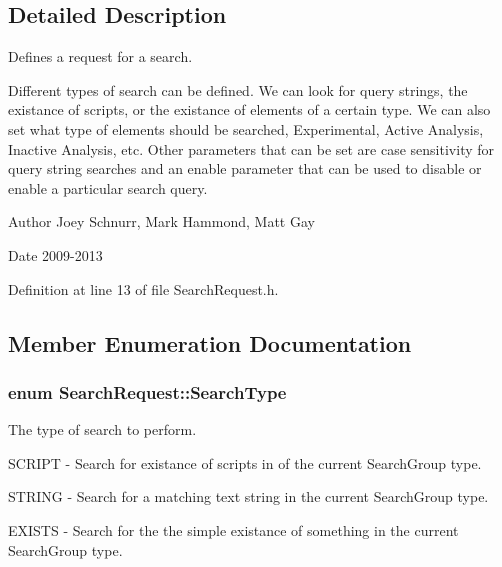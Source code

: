 \subsection{Detailed Description}
Defines a request for a search. 

Different types of search can be defined. We can look for query strings, the existance of scripts, or the existance of elements of a certain type. We can also set what type of elements should be searched, Experimental, Active Analysis, Inactive Analysis, etc. Other parameters that can be set are case sensitivity for query string searches and an enable parameter that can be used to disable or enable a particular search query. \begin{DoxyAuthor}{Author}
Joey Schnurr, Mark Hammond, Matt Gay 
\end{DoxyAuthor}
\begin{DoxyDate}{Date}
2009-\/2013 
\end{DoxyDate}


Definition at line 13 of file Search\-Request.\-h.



\subsection{Member Enumeration Documentation}
\hypertarget{struct_search_request_a715ada4359cbb4eacc24e02015445dc7}{
\subsubsection[{Search\-Type}]{\setlength{\rightskip}{0pt plus 5cm}enum {\bf Search\-Request\-::\-Search\-Type}}}\label{struct_search_request_a715ada4359cbb4eacc24e02015445dc7}


The type of search to perform. 


\begin{DoxyItemize}
\item S\-C\-R\-I\-P\-T -\/ Search for existance of scripts in of the current Search\-Group type.
\item S\-T\-R\-I\-N\-G -\/ Search for a matching text string in the current Search\-Group type.
\item E\-X\-I\-S\-T\-S -\/ Search for the the simple existance of something in the current Search\-Group type. 
\end{DoxyItemize}

